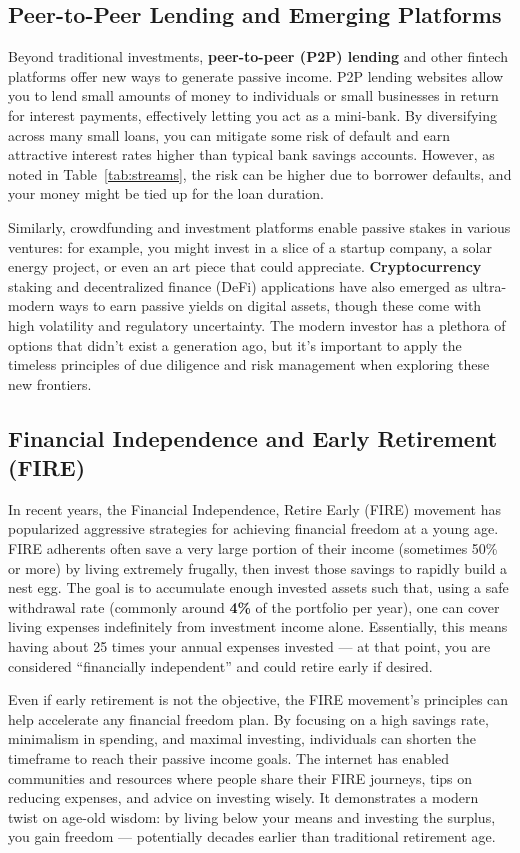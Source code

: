 \documentclass[12pt]{article}
\begin{document}
\subsection{Peer-to-Peer Lending and Emerging Platforms}
Beyond traditional investments, \textbf{peer-to-peer (P2P) lending} and other fintech platforms offer new ways to generate passive income. P2P lending websites allow you to lend small amounts of money to individuals or small businesses in return for interest payments, effectively letting you act as a mini-bank. By diversifying across many small loans, you can mitigate some risk of default and earn attractive interest rates higher than typical bank savings accounts. However, as noted in Table~\ref{tab:streams}, the risk can be higher due to borrower defaults, and your money might be tied up for the loan duration.
\par
Similarly, crowdfunding and investment platforms enable passive stakes in various ventures: for example, you might invest in a slice of a startup company, a solar energy project, or even an art piece that could appreciate. \textbf{Cryptocurrency} staking and decentralized finance (DeFi) applications have also emerged as ultra-modern ways to earn passive yields on digital assets, though these come with high volatility and regulatory uncertainty. The modern investor has a plethora of options that didn't exist a generation ago, but it's important to apply the timeless principles of due diligence and risk management when exploring these new frontiers.
\subsection{Financial Independence and Early Retirement (FIRE)}
In recent years, the Financial Independence, Retire Early (FIRE) movement has popularized aggressive strategies for achieving financial freedom at a young age. FIRE adherents often save a very large portion of their income (sometimes 50\% or more) by living extremely frugally, then invest those savings to rapidly build a nest egg. The goal is to accumulate enough invested assets such that, using a safe withdrawal rate (commonly around \textbf{4\%} of the portfolio per year), one can cover living expenses indefinitely from investment income alone\cite{Bengen1994}. Essentially, this means having about 25 times your annual expenses invested --- at that point, you are considered ``financially independent'' and could retire early if desired.
\par
Even if early retirement is not the objective, the FIRE movement's principles can help accelerate any financial freedom plan. By focusing on a high savings rate, minimalism in spending, and maximal investing, individuals can shorten the timeframe to reach their passive income goals. The internet has enabled communities and resources where people share their FIRE journeys, tips on reducing expenses, and advice on investing wisely. It demonstrates a modern twist on age-old wisdom: by living below your means and investing the surplus, you gain freedom --- potentially decades earlier than traditional retirement age.
\end{document}
